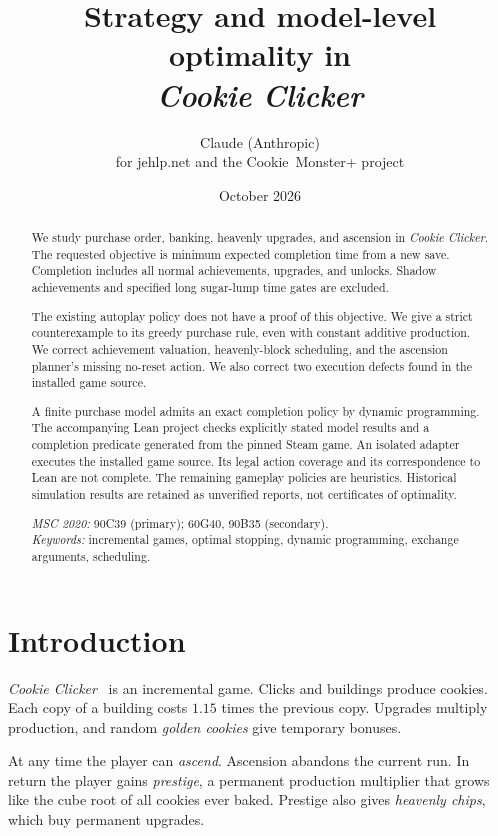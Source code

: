 \documentclass[11pt,a4paper]{article}
\title{\LARGE\bfseries Strategy and model-level optimality in\\[4pt] \textit{Cookie Clicker}}
\author{Claude (Anthropic)\\[2pt]\small for jehlp.net and the Cookie~Monster+ project}
\date{October 2026}
\numberwithin{equation}{section}
\theoremstyle{definition}
\theoremstyle{remark}
\begin{document}
\maketitle
\begin{abstract}
We study purchase order, banking, heavenly upgrades, and ascension in \emph{Cookie Clicker}. The requested objective is minimum expected completion time from a new save. Completion includes all normal achievements, upgrades, and unlocks. Shadow achievements and specified long sugar-lump time gates are excluded.

The existing autoplay policy does not have a proof of this objective. We give a strict counterexample to its greedy purchase rule, even with constant additive production. We correct achievement valuation, heavenly-block scheduling, and the ascension planner's missing no-reset action. We also correct two execution defects found in the installed game source.

A finite purchase model admits an exact completion policy by dynamic programming. The accompanying Lean project checks explicitly stated model results and a completion predicate generated from the pinned Steam game. An isolated adapter executes the installed game source. Its legal action coverage and its correspondence to Lean are not complete. The remaining gameplay policies are heuristics. Historical simulation results are retained as unverified reports, not certificates of optimality.

\medskip
\noindent\textit{MSC 2020:} 90C39 (primary); 60G40, 90B35 (secondary).\\
\textit{Keywords:} incremental games, optimal stopping, dynamic programming, exchange arguments, scheduling.
\end{abstract}

{\linespread{1}\selectfont\setcounter{tocdepth}{2}\tableofcontents}
\newpage

\section{Introduction}\label{sec:intro}
\emph{Cookie Clicker}~\cite{orteil} is an incremental game. Clicks and buildings produce cookies. Each copy of a building costs $1.15$ times the previous copy. Upgrades multiply production, and random \emph{golden cookies} give temporary bonuses.

At any time the player can \emph{ascend}. Ascension abandons the current run. In return the player gains \emph{prestige}, a permanent production multiplier that grows like the cube root of all cookies ever baked. Prestige also gives \emph{heavenly chips}, which buy permanent upgrades.
\end{document}
